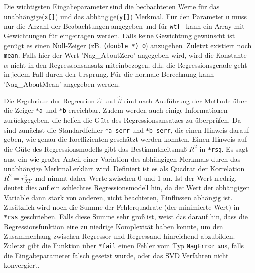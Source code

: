 Die wichtigsten Eingabeparameter sind die beobachteten Werte für das unabhängige(\lstinline{x[]}) und das abhängige(\lstinline{y[]}) Merkmal.
Für den Parameter \lstinline{n} muss nur die Anzahl der Beobachtungen angegeben und für \lstinline{wt[]} kann ein Array mit Gewichtungen für eingetragen werden.   
Falls keine Gewichtung gewünscht ist genügt es einen Null-Zeiger (zB. \lstinline{(double *) 0}) anzugeben.
Zuletzt existiert noch \lstinline{mean}.
Falls hier der Wert 'Nag\_AboutZero' angegeben wird, wird die Konstante $\alpha$ nicht in den Regressionsansatz miteinbezogen, d.h. die Regressionsgerade geht in jedem Fall durch den Ursprung.
Für die normale Berechnung kann 'Nag\_AboutMean' angegeben werden.

Die Ergebnisse der Regression $\hat\alpha$ und $\hat\beta$ sind nach Ausführung der Methode über die Zeiger \lstinline{*a} und \lstinline{*b} erreichbar.
Zudem werden auch einige Informationen zurückgegeben, die helfen die Güte des Regressionsansatzes zu überprüfen.
Da sind zunächst die Standardfehler \lstinline{*a_serr} und \lstinline{*b_serr}, die einen Hinweis darauf geben, wie genau die Koeffizienten geschätzt werden konnten.
Einen Hinweis auf die Güte des Regressionsmodells gibt das Bestimmtheitsmaß $R^2$ in \lstinline{*rsq}.
Es sagt aus, ein wie großer Anteil einer Variation des abhängigen Merkmals durch das unabhängige Merkmal erklärt wird.
Definiert ist es als Quadrat der Korrelation $R^2 = r_{XY}^2$ und nimmt daher Werte zwischen 0 und 1 an.
Ist der Wert niedrig, deutet dies auf ein schlechtes Regressionsmodell hin, da der Wert der abhängigen Variable dann stark von anderen, nicht beachteten, Einflüssen abhängig ist.
Zusätzlich wird noch die Summe der Fehlerquadrate (der minimierte Wert) in \lstinline{*rss} geschrieben.
Falls diese Summe sehr groß ist, weist das darauf hin, dass die Regressionsfunktion eine zu niedrige Komplexität haben könnte, um den Zusammenhang zwischen Regressor und Regressand hinreichend abzubilden.
Zuletzt gibt die Funktion über \lstinline{*fail} einen Fehler vom Typ \lstinline{NagError} aus, falls die Eingabeparameter falsch gesetzt wurde, oder das SVD Verfahren nicht konvergiert.


